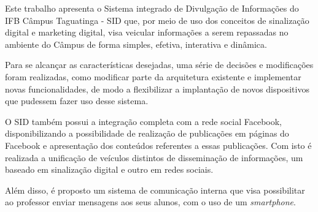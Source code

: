 \begin{resumo}
Este trabalho apresenta o Sistema integrado de Divulgação de Informações do IFB Câmpus Taguatinga - SID que, por meio de uso dos conceitos de sinalização digital e marketing digital, visa veicular informações a serem repassadas no ambiente do Câmpus de forma simples, efetiva, interativa e dinâmica.

Para se alcançar as  características desejadas, uma série de decisões e modificações foram realizadas, como modificar parte da arquitetura existente e implementar novas funcionalidades, de modo a flexibilizar a implantação de novos dispositivos que pudessem fazer uso desse sistema. 

O SID também possui a integração completa com a rede social Facebook, disponibilizando a possibilidade de realização de publicações em páginas do Facebook e apresentação dos conteúdos referentes a essas publicações. Com isto é realizada a unificação de veículos distintos de disseminação de informações, um baseado em sinalização digital e outro em redes sociais.

Além disso, é proposto um sistema de comunicação interna que visa possibilitar ao professor enviar mensagens aos seus alunos, com o uso de um \textit{smartphone}.

 \vspace{\onelineskip}
    
 \noindent
\end{resumo}
